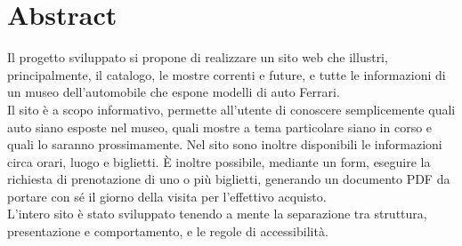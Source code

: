 \section{Abstract}
Il progetto sviluppato si propone di realizzare un sito web che illustri, principalmente, il catalogo, le mostre correnti e future, e tutte le informazioni di un museo dell'automobile che espone modelli di auto Ferrari.\\
Il sito è a scopo informativo, permette all'utente di conoscere semplicemente quali auto siano esposte nel museo, quali mostre a tema particolare siano in corso e quali lo saranno prossimamente. Nel sito sono inoltre disponibili le informazioni circa orari, luogo e biglietti. È inoltre possibile, mediante un form, eseguire la richiesta di prenotazione di uno o più biglietti, generando un documento PDF da portare con sé il giorno della visita per l'effettivo acquisto.\\
L'intero sito è stato sviluppato tenendo a mente la separazione tra struttura, presentazione e comportamento, e le regole di accessibilità.
